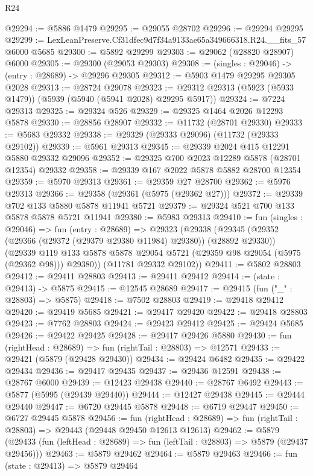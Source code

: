 \begin{lexlean}{R24}
\begin{coremodule}
@29294 := @5886 @1479
@29295 := @29055 @28702
@29296 := @29294 @29295
@29299 := LexLeanPreserve.Cf31dfec9d7f34a9133ae65a349666318.R24.__fits_57 @6000 @5685
@29300 := @5892 @29299
@29303 := @29062 (@28820 @28907) @6000
@29305 := @29300 (@29053 @29303)
@29308 := (singles : @29046) -> (entry : @28689) -> @29296 @29305
@29312 := @5903 @1479 @29295 @29305 @2028
@29313 := @28724 @29078
@29323 := @29312 @29313 (@5923 (@5933 @1479)) (@5939 (@5940 (@5941 @2028) @29295 @5917))
@29324 := @7224 @29313
@29325 := @29324 @526
@29329 := @29325 @1464 @2026 @12293 @5878
@29330 := @28856 @28907
@29332 := @11732 (@28701 @29330)
@29333 := @5683 @29332
@29338 := @29329 (@29333 @29096) (@11732 (@29333 @29102))
@29339 := @5961 @29313
@29345 := @29339 @2024 @415 @12291 @5880 @29332 @29096
@29352 := @29325 @700 @2023 @12289 @5878 (@28701 @12354) @29332
@29358 := @29339 @167 @2022 @5878 @5882 @28700 @12354
@29359 := @5970 @29313
@29361 := @29359 @27 @28700
@29362 := @5976 @29313
@29366 := @29358 (@29361 (@5975 (@29362 @27)))
@29372 := @29339 @702 @133 @5880 @5878 @11941 @5721
@29379 := @29324 @521 @700 @133 @5878 @5878 @5721 @11941
@29380 := @5983 @29313
@29410 := fun (singles : @29046) =>
  fun (entry : @28689) =>
  @29323
    (@29338
      (@29345
        (@29352 (@29366 (@29372 (@29379 @29380 @11984) @29380)) (@28892 @29330))
        (@29339 @119 @133 @5878 @5878 @29054 @5721 (@29359 @98 @29054 (@5975 (@29362 @98))) @29380))
      (@11781 @29332 @29102))
@29411 := @5802 @28803
@29412 := @29411 @28803
@29413 := @29411 @29412
@29414 := (state : @29413) -> @5875
@29415 := @12545 @28689
@29417 := @29415 (fun ("_" : @28803) => @5875)
@29418 := @7502 @28803
@29419 := @29418 @29412
@29420 := @29419 @5685
@29421 := @29417 @29420
@29422 := @29418 @28803
@29423 := @7762 @28803
@29424 := @29423 @29412
@29425 := @29424 @5685
@29426 := @29422 @29425
@29428 := @29417 @29426 @5880
@29430 := fun (rightHead : @28689) => fun (rightTail : @28803) => @12571
@29433 := @29421 (@5879 (@29428 @29430))
@29434 := @29424 @6482
@29435 := @29422 @29434
@29436 := @29417 @29435
@29437 := @29436 @12591
@29438 := @28767 @6000
@29439 := @12423 @29438
@29440 := @28767 @6492
@29443 := @5877 (@5995 (@29439 @29440))
@29444 := @12427 @29438
@29445 := @29444 @29440
@29447 := @6720 @29445 @5878
@29448 := @6719 @29447
@29450 := @6727 @29445 @5878
@29456 := fun (rightHead : @28689) =>
  fun (rightTail : @28803) => @29443 (@29448 @29450 @12613 @12613)
@29462 := @5879
    (@29433 (fun (leftHead : @28689) => fun (leftTail : @28803) => @5879 (@29437 @29456)))
@29463 := @5879 @29462
@29464 := @5879 @29463
@29466 := fun (state : @29413) => @5879 @29464

\end{coremodule}
\end{lexlean}
